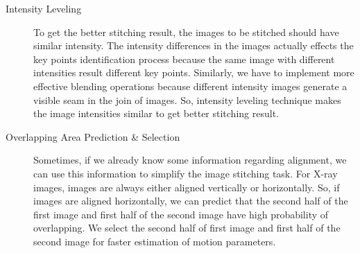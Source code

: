 \begin{description}
	\item [Intensity Leveling] To get the better stitching result, the images to be stitched should have similar intensity. The intensity differences in the images actually effects the key points identification process because the same image with different intensities result different key points. Similarly, we have to implement more effective blending operations because different intensity images generate a visible seam in the join of images. So, intensity leveling technique makes the image intensities similar to get better stitching result. 
	\item [Overlapping Area Prediction \& Selection] Sometimes, if we already know some information regarding alignment, we can use this information to simplify the image stitching task. For X-ray images, images are always either aligned vertically or horizontally. So, if images are aligned horizontally, we can predict that the second half of the first image and first half of the second image have high probability of overlapping. We select the second half of first image and first half of the second image for faster estimation of motion parameters. 
\begin{figure}%
\centering
{}
\end{figure}
\end{description}
